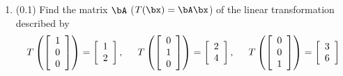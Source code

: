 \documentclass[11pt,titlepage,fleqn]{article}
\begin{document}
\begin{enumerate}
\begin{enumerate}
\item (0.1) Find the matrix $\bA$ ($T(\bx) = \bA\bx$) of the linear transformation described by
%
\begin{equation*}
T \left( \left[ \begin{array}{r} 1 \\ 0 \\ 0  \end{array} \right] \right) = \left[ \begin{array}{r} 1 \\ 2 \end{array} \right],
\hspace{0.5cm}
T \left( \left[ \begin{array}{r} 0 \\ 1 \\ 0  \end{array} \right] \right) = \left[ \begin{array}{r} 2 \\ 4 \end{array} \right],
\hspace{0.5cm}
T \left( \left[ \begin{array}{r} 0 \\ 0 \\ 1  \end{array} \right] \right) = \left[ \begin{array}{r} 3 \\ 6 \end{array} \right]
\end{equation*}


\end{enumerate}
\end{enumerate}
\end{document}
